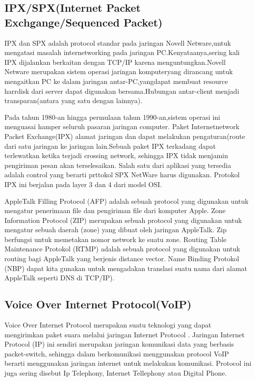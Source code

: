 \documentclass{article}
\begin{document}
\subsection{IPX/SPX(Internet Packet Exchgange/Sequenced Packet)}  
IPX dan SPX adalah protocol standar pada jaringan Novell Netware,untuk mengatasi masalah internetworking pada jaringan 
PC.Kenyataanya,sering kali IPX dijalankan berkaitan dengan TCP/IP karena menguntungkan.Novell Netware merupakan sistem operasi jaringan 
komputeryang dirancang untuk mengaitkan PC ke dalam jaringan antar-PC,yangdapat membuat resource harrdisk dari server dapat digunakan 
bersama.Hubungan antar-client menjadi transparan(antara yang satu dengan lainnya).

Pada tahun 1980-an hingga permulaan tahun 1990-an,sistem operasi ini menguasai hamper seluruh pasaran jaringan computer.
Paket Internetnetwork Packet Exchange(IPX) alamat jaringan dan dapat melakukan pengaturan(route dari satu jaringan ke jaringan 
lain.Sebuah paket IPX terkadang dapat terlewatkan ketika terjadi crossing network, sehingga IPX tidak menjamin pengiriman pesan akan 
terselesaikan. Salah satu dari aplikasi yang tersedia adalah control yang berarti prttokol SPX NetWare harus digunakan. Protokol IPX ini 
berjalan pada layer 3 dan 4 dari model OSI.

AppleTalk Filling Protocol (AFP) adalah sebuah protocol yang digunakan untuk mengatur penerimaan file dan pengiriman file dari komputer 
Apple.
Zone Information Protocol (ZIP) merupakan sebuah  protocol yang digunakan  untuk mengatur sebuah  daerah (zone) yang dibuat  oleh 
jaringan AppleTalk. Zip berfungsi untuk memetakan nomor network ke suatu zone.
Routing Table Maintenance Protokol (RTMP) adalah sebuah  protocol yang digunakan untuk  routing bagi AppleTalk yang berjenis distance 
vector.
Name Binding Protokol (NBP) dapat kita gunakan untuk mengadakan translasi suatu nama dari alamat AppleTalk seperti DNS di TCP/IP).

\subsection{Voice Over Internet Protocol(VoIP)}
Voice Over Internet Protocol merupakan suatu teknologi yang dapat mengirimkan paket suara melalui jaringan Internet Protocol . Jaringan 
Internet Protocol (IP) ini  sendiri merupakan jaringan komunikasi data yang berbasis packet-switch, sehingga dalam berkomunikasi 
menggunakan protocol VoIP berarti menggunakan jaringan internet untuk melakukan komunikasi. Protocol ini juga sering disebut Ip 
Telephony, Internet Tellephony atau Digital Phone.
\end{document}
